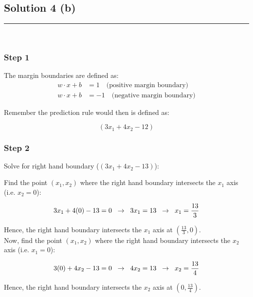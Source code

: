 \documentclass{article}
\begin{document}
\newpage

\subsection*{Solution 4 (b)}
\noindent\rule{\textwidth}{0.4pt}\\

\subsubsection*{Step 1}
\parbox{\textwidth}{
The margin boundaries are defined as:
\begin{align}
w \cdot x + b &= 1 \quad \text{(positive margin boundary)}\\
w \cdot x + b &= -1 \quad \text{(negative margin boundary)}
\end{align}

Remember the prediction rule would then is defined as:

$$\left(3x_{1}+4x_{2}-12\right)$$
}

\subsubsection*{Step 2}
\parbox{\textwidth}{
Solve for right hand boundary ($\left(3x_{1}+4x_{2}-13\right)$):

Find the point $(x_{1},x_{2})$ where the right hand boundary intersects the $x_{1}$ axis (i.e. $x_{2}=0$):

$$3x_{1} + 4(0) - 13 = 0 \hspace{0.2cm} \rightarrow \hspace{0.2cm} 3x_{1} = 13 \hspace{0.2cm} \rightarrow \hspace{0.2cm} x_{1} = \frac{13}{3}$$

Hence, the right hand boundary intersects the $x_{1}$ axis at $\left(\frac{13}{3}, 0\right)$.\\


Now, find the point $(x_{1},x_{2})$ where the right hand boundary intersects the $x_{2}$ axis (i.e. $x_{1}=0$):

$$3(0) + 4x_{2} - 13 = 0 \hspace{0.2cm} \rightarrow \hspace{0.2cm} 4x_{2} = 13 \hspace{0.2cm} \rightarrow \hspace{0.2cm} x_{2} = \frac{13}{4}$$

Hence, the right hand boundary intersects the $x_{2}$ axis at $\left(0, \frac{13}{4}\right)$.
}
\end{document}
